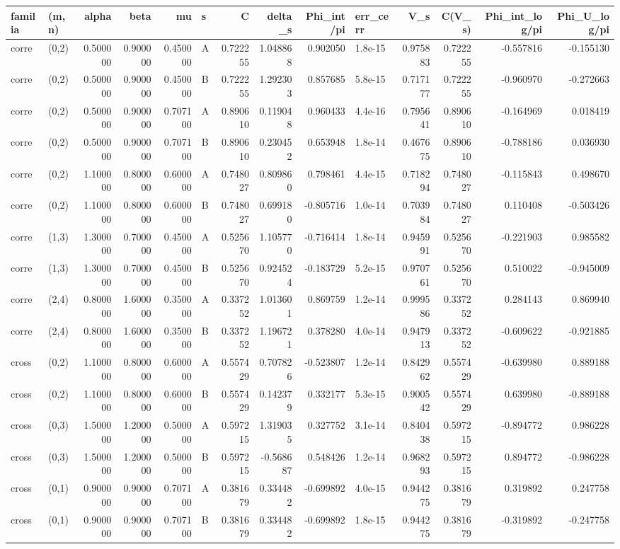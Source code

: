 \begin{tabular}{llrrrlrrrlrrrr}
\toprule
familia & (m,n) & alpha & beta & mu & s & C & delta_s & Phi_int/pi & err_cerr & V_s & C(V_s) & Phi_int_log/pi & Phi_U_log/pi \\
\midrule
corre & (0,2) & 0.500000 & 0.900000 & 0.450000 & A & 0.722255 & 1.048868 & 0.902050 & 1.8e-15 & 0.975883 & 0.722255 & -0.557816 & -0.155130 \\
corre & (0,2) & 0.500000 & 0.900000 & 0.450000 & B & 0.722255 & 1.292303 & 0.857685 & 5.8e-15 & 0.717177 & 0.722255 & -0.960970 & -0.272663 \\
corre & (0,2) & 0.500000 & 0.900000 & 0.707100 & A & 0.890610 & 0.119048 & 0.960433 & 4.4e-16 & 0.795641 & 0.890610 & -0.164969 & 0.018419 \\
corre & (0,2) & 0.500000 & 0.900000 & 0.707100 & B & 0.890610 & 0.230452 & 0.653948 & 1.8e-14 & 0.467675 & 0.890610 & -0.788186 & 0.036930 \\
corre & (0,2) & 1.100000 & 0.800000 & 0.600000 & A & 0.748027 & 0.809860 & 0.798461 & 4.4e-15 & 0.718294 & 0.748027 & -0.115843 & 0.498670 \\
corre & (0,2) & 1.100000 & 0.800000 & 0.600000 & B & 0.748027 & 0.699180 & -0.805716 & 1.0e-14 & 0.703984 & 0.748027 & 0.110408 & -0.503426 \\
corre & (1,3) & 1.300000 & 0.700000 & 0.450000 & A & 0.525670 & 1.105770 & -0.716414 & 1.8e-14 & 0.945991 & 0.525670 & -0.221903 & 0.985582 \\
corre & (1,3) & 1.300000 & 0.700000 & 0.450000 & B & 0.525670 & 0.924524 & -0.183729 & 5.2e-15 & 0.970761 & 0.525670 & 0.510022 & -0.945009 \\
corre & (2,4) & 0.800000 & 1.600000 & 0.350000 & A & 0.337252 & 1.013601 & 0.869759 & 1.2e-14 & 0.999586 & 0.337252 & 0.284143 & 0.869940 \\
corre & (2,4) & 0.800000 & 1.600000 & 0.350000 & B & 0.337252 & 1.196721 & 0.378280 & 4.0e-14 & 0.947913 & 0.337252 & -0.609622 & -0.921885 \\
cross & (0,2) & 1.100000 & 0.800000 & 0.600000 & A & 0.557429 & 0.707826 & -0.523807 & 1.2e-14 & 0.842962 & 0.557429 & -0.639980 & 0.889188 \\
cross & (0,2) & 1.100000 & 0.800000 & 0.600000 & B & 0.557429 & 0.142379 & 0.332177 & 5.3e-15 & 0.900542 & 0.557429 & 0.639980 & -0.889188 \\
cross & (0,3) & 1.500000 & 1.200000 & 0.500000 & A & 0.597215 & 1.319035 & 0.327752 & 3.1e-14 & 0.840438 & 0.597215 & -0.894772 & 0.986228 \\
cross & (0,3) & 1.500000 & 1.200000 & 0.500000 & B & 0.597215 & -0.568687 & 0.548426 & 1.2e-14 & 0.968293 & 0.597215 & 0.894772 & -0.986228 \\
cross & (0,1) & 0.900000 & 0.900000 & 0.707100 & A & 0.381679 & 0.334482 & -0.699892 & 4.0e-15 & 0.944275 & 0.381679 & 0.319892 & 0.247758 \\
cross & (0,1) & 0.900000 & 0.900000 & 0.707100 & B & 0.381679 & 0.334482 & -0.699892 & 1.8e-15 & 0.944275 & 0.381679 & -0.319892 & -0.247758 \\
\bottomrule
\end{tabular}
